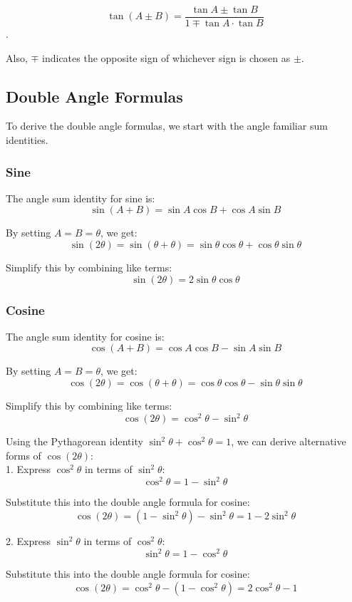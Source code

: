 \documentclass[12pt]{article}
\begin{document}
\[\tan(A\pm B)=\frac{\tan A\pm \tan B}{1\mp\tan A\cdot\tan B}\].

Also, \(\mp\) indicates the opposite sign of whichever sign is chosen as \(\pm\).

\subsection{Double Angle Formulas}

To derive the double angle formulas, we start with the angle familiar sum identities.

\subsubsection{Sine}

The angle sum identity for sine is:
\[
\sin(A + B) = \sin A \cos B + \cos A \sin B
\]

By setting \(A = B = \theta\), we get:
\[
\sin(2\theta) = \sin(\theta + \theta) = \sin \theta \cos \theta + \cos \theta \sin \theta
\]

Simplify this by combining like terms:
\[
\sin(2\theta) = 2 \sin \theta \cos \theta
\]

\subsubsection{Cosine}

The angle sum identity for cosine is:
\[
\cos(A + B) = \cos A \cos B - \sin A \sin B
\]

By setting \(A = B = \theta\), we get:
\[
\cos(2\theta) = \cos(\theta + \theta) = \cos \theta \cos \theta - \sin \theta \sin \theta
\]

Simplify this by combining like terms:
\[
\cos(2\theta) = \cos^2 \theta - \sin^2 \theta
\]

Using the Pythagorean identity \(\sin^2 \theta + \cos^2 \theta = 1\), we can derive alternative forms of \(\cos(2\theta)\):\\

1. Express \(\cos^2 \theta\) in terms of \(\sin^2 \theta\):
\[
\cos^2 \theta = 1 - \sin^2 \theta
\]

Substitute this into the double angle formula for cosine:
\[
\cos(2\theta) = (1 - \sin^2 \theta) - \sin^2 \theta = 1 - 2 \sin^2 \theta
\]

2. Express \(\sin^2 \theta\) in terms of \(\cos^2 \theta\):
\[
\sin^2 \theta = 1 - \cos^2 \theta
\]

Substitute this into the double angle formula for cosine:
\[
\cos(2\theta) = \cos^2 \theta - (1 - \cos^2 \theta) = 2 \cos^2 \theta - 1
\]
\end{document}
